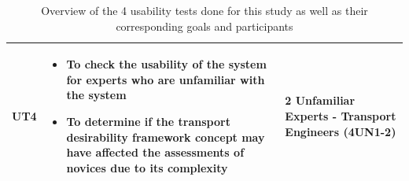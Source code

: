 \documentclass{sigchi}
\begin{document}
\begin{table}[!htbp]
\begin{tabular}{p{}|p{}|p{}}
        UT4 &
        \begin{itemize}
            \item To check the usability of the system for experts who are unfamiliar with the system
            \item To determine if the transport desirability framework concept may have affected the assessments of novices due to its complexity
        \end{itemize}
        & 2 Unfamiliar Experts - Transport Engineers (4UN1-2) \\
    \bottomrule
    \end{tabular}
    \caption{Overview of the 4 usability tests done for this study as well as their corresponding goals and participants}
    \label{tab:ut}
\end{table}
\end{document}
